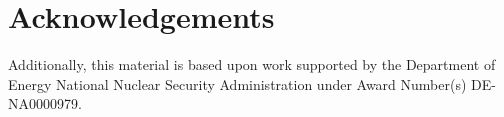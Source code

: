 \section{Acknowledgements}

Additionally, this material is based upon work supported by the Department of 
Energy National Nuclear Security Administration under Award Number(s) 
DE-NA0000979. %
